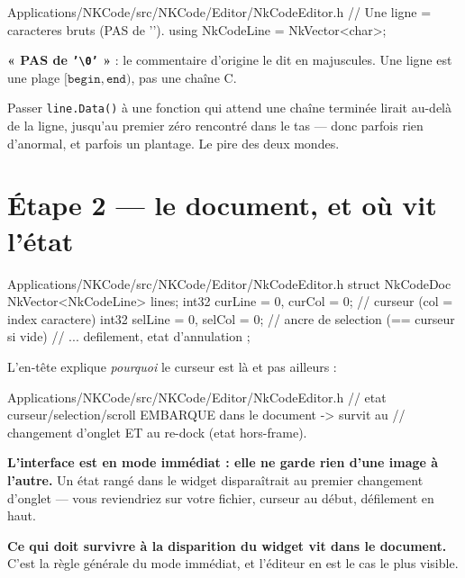 \begin{nkcode}{Applications/NKCode/src/NKCode/Editor/NkCodeEditor.h}
// Une ligne = caracteres bruts (PAS de '\0').
using NkCodeLine = NkVector<char>;
\end{nkcode}

\begin{nkpiege}
\textbf{« PAS de \texttt{'\textbackslash 0'} »} : le commentaire d'origine le dit
en majuscules. Une ligne est une plage $[\texttt{begin}, \texttt{end})$, pas une
chaîne C.

Passer \texttt{line.Data()} à une fonction qui attend une chaîne terminée lirait
au-delà de la ligne, jusqu'au premier zéro rencontré dans le tas --- donc parfois
rien d'anormal, et parfois un plantage. Le pire des deux mondes.
\end{nkpiege}

\section{Étape 2 --- le document, et où vit l'état}

\begin{nkcode}{Applications/NKCode/src/NKCode/Editor/NkCodeEditor.h}
struct NkCodeDoc {
        NkVector<NkCodeLine> lines;
        int32 curLine = 0, curCol = 0;   // curseur (col = index caractere)
        int32 selLine = 0, selCol = 0;   // ancre de selection (== curseur si vide)
        // ... defilement, etat d'annulation
};
\end{nkcode}

L'en-tête explique \emph{pourquoi} le curseur est là et pas ailleurs :

\begin{nkcode}{Applications/NKCode/src/NKCode/Editor/NkCodeEditor.h}
// etat curseur/selection/scroll EMBARQUE dans le document -> survit au
// changement d'onglet ET au re-dock (etat hors-frame).
\end{nkcode}

\begin{nkretenir}
\textbf{L'interface est en mode immédiat : elle ne garde rien d'une image à
l'autre.} Un état rangé dans le widget disparaîtrait au premier changement
d'onglet --- vous reviendriez sur votre fichier, curseur au début, défilement en
haut.

\textbf{Ce qui doit survivre à la disparition du widget vit dans le document.}
C'est la règle générale du mode immédiat, et l'éditeur en est le cas le plus
visible.
\end{nkretenir}

